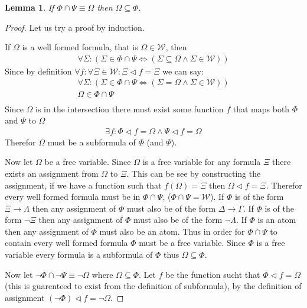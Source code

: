 \documentclass{article}
\newtheorem{lem}{Lemma}
\begin{document}
\begin{lem}
If $\Phi \cap \Psi \equiv \Omega$ then $\Omega \subseteq \Phi$.
\end{lem}
\begin{proof}
Let us try a proof by induction.

If $\Omega$ is a well formed formula, that is $\Omega \in \mathcal{W}$, then
\begin{align*}
\forall \Sigma : (\Sigma \in \Phi \cap \Psi \iff (\Sigma \subseteq \Omega \land \Sigma \in \mathcal{W}))
\end{align*}
Since by definition $\forall f: \forall \Xi \in \mathcal{W} : \Xi \lhd f = \Xi$ we can say:
\begin{gather*}
\forall \Sigma : (\Sigma \in \Phi \cap \Psi \iff (\Sigma = \Omega \land \Sigma \in \mathcal{W})) \\
\Omega \in \Phi \cap \Psi \\
\end{gather*}
Since $\Omega$ is in the intersection there must exist some function $f$ that maps both $\Phi$ and $\Psi$ to $\Omega$
\begin{align*}
\exists f: \Phi \lhd f = \Omega \land \Psi \lhd f = \Omega
\end{align*}
Therefor $\Omega$ must be a subformula of $\Phi$ (and $\Psi$).

Now let $\Omega$ be a free variable.
Since $\Omega$ is a free variable for any formula $\Xi$ there exists an assignment from $\Omega$ to $\Xi$.
This can be see by constructing the assignment, if we have a function such that $f(\Omega) = \Xi$ then $\Omega \lhd f = \Xi$.
Therefor every well formed formula must be in $\Phi \cap \Psi$, ($\Phi \cap \Psi = \mathcal{W}$). 
If $\Phi$ is of the form $\Xi \rightarrow \Lambda$ then any assignment of $\Phi$ must also be of the form $\Delta \rightarrow \Gamma$.
If $\Phi$ is of the form $\neg\Xi$ then any assignment of $\Phi$ must also be of the form $\neg\Lambda$.
If $\Phi$ is an atom then any assignment of $\Phi$ must also be an atom.
Thus in order for $\Phi \cap \Psi$ to contain every well formed formula $\Phi$ must be a free variable.
Since $\Phi$ is a free variable every formula is a subformula of $\Phi$ thus $\Omega \subseteq \Phi$.

Now let $\neg \Phi \cap \neg \Psi \equiv \neg \Omega$ where $\Omega \subseteq \Phi$.
Let $f$ be the function sucht that $\Phi \lhd f =\Omega$ (this is guarenteed to exist from the definition of subformula),
by the definition of assignment $(\neg\Phi) \lhd f = \neg\Omega$.


\end{proof}
\end{document}

